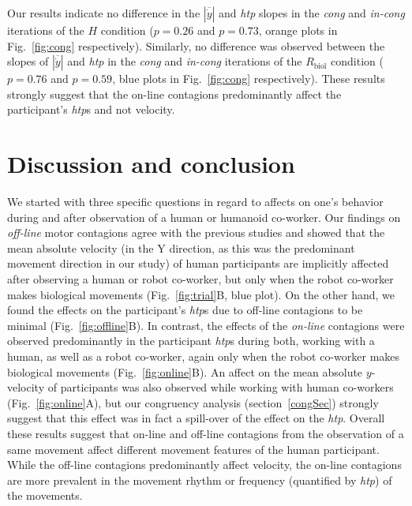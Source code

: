 \documentclass[a4paper, 12pt, oneside]{Thesis}  %
\begin{document}
Our results indicate no difference in the $|\overline{\dot{y}}|$ and {\it htp} slopes in the {\it cong} and {\it in-cong} iterations of the $H$ condition ($p = 0.26$ and $p = 0.73$, orange plots in Fig.~\ref{fig:cong} respectively). Similarly, no difference was observed between the slopes of $|\overline{\dot{y}}|$  and {\it htp} in the {\it cong} and {\it in-cong} iterations of the $R_{\text{biol}}$ condition ($p = 0.76$ and $p = 0.59$, blue plots in Fig.~\ref{fig:cong} respectively). These results strongly suggest that the on-line contagions predominantly affect the participant's {\it htp}s and not velocity.



\clearpage
\section{Discussion and conclusion}

We started with three specific questions in regard to affects on one's behavior during and after observation of a human or humanoid co-worker. Our findings on {\it off-line} motor contagions agree with the previous studies and showed that the mean absolute velocity (in the Y direction, as this was the predominant movement direction in our study) of human participants are implicitly affected after observing a human or robot co-worker, but only when the robot co-worker makes biological movements (Fig.~\ref{fig:trial}B, blue plot). On the other hand, we found the effects on the participant's {\it htp}s due to off-line contagions to be minimal (Fig.~\ref{fig:offline}B). In contrast, the effects of the {\it on-line} contagions were observed predominantly in the participant {\it htp}s during both, working with a human, as well as a robot co-worker, again only when the robot co-worker makes biological movements (Fig.~\ref{fig:online}B). An affect on the mean absolute $y$-velocity of participants was also observed while working with human co-workers (Fig.~\ref{fig:online}A), but our congruency analysis (section~\ref{congSec}) strongly suggest that this effect was in fact a spill-over of the effect on the {\it htp}.  Overall these results suggest that on-line and off-line contagions from the observation of a same movement affect different movement features of the human participant. While the off-line contagions predominantly affect velocity, the on-line contagions are more prevalent in the movement rhythm or frequency (quantified by {\it htp}) of the movements.
\end{document}
